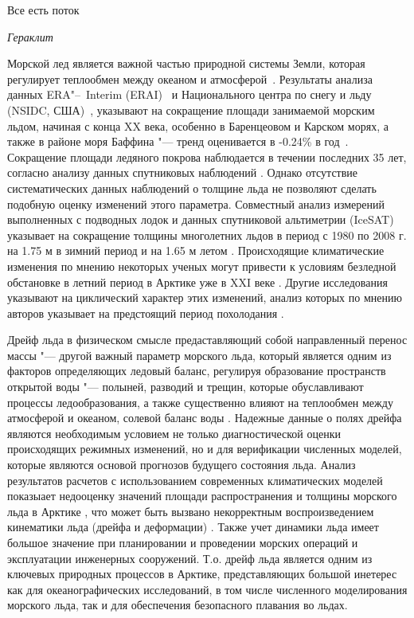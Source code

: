 
{\actuality} \epigraph{Все есть поток}{\textit{Гераклит}}
Морской лед является важной частью природной системы Земли, которая регулирует теплообмен между океаном и атмосферой~\cite{vaughan2013observations}. Результаты анализа данных ERA"--~Interim (ERAI)~\cite{dee2011era} и Национального центра по снегу и льду (NSIDC, США)~\cite{cavalieri1996updated}, указывают на сокращение площади занимаемой морским льдом, начиная с конца XX века, особенно в Баренцеовом и Карском морях, а также в районе моря Баффина "--- тренд оценивается в -0.24\% в год~\cite{park2015attribution}. Сокращение площади ледяного покрова наблюдается в течении последних 35 лет, согласно анализу данных спутниковых наблюдений \cite{simmonds2015comparing}. Однако отсутствие систематических данных наблюдений о толщине льда не позволяют сделать подобную оценку изменений этого параметра. Совместный анализ измерений выполненных с подводных лодок и данных спутниковой альтиметрии (IceSAT) указывает на сокращение толщины многолетних льдов в период с 1980 по 2008 г. на 1.75 м в зимний период и на 1.65 м летом \cite{rothrock2008decline,kwok2009thinning}. Происходящие климатические изменения по мнению некоторых ученых могут привести к условиям безледной обстановке в летний период в Арктике уже в XXI веке  \cite{stroeve2007arctic,wang2009sea,massonnet2012constraining,Laliber_2016,Jahn_2016}. Другие исследования указывают на циклический характер этих изменений, анализ которых по мнению авторов указывает на предстоящий период похолодания \cite{Frolov2010,Frolov2007_1,Frolov2007_2}.

Дрейф льда в физическом смысле предаставляющий собой направленный перенос массы "--- другой важный параметр морского льда, который является одним из факторов определяющих ледовый баланс, регулируя образование пространств открытой воды "--- полыней, разводий и трещин, которые обуславливают процессы ледообразования, а также существенно влияют на теплообмен между атмосферой и океаном, солевой баланс воды \cite{jordan1999heat,Makshtas1977}. Надежные данные о полях дрейфа являются необходимым условием не только диагностической оценки происходящих режимных изменений, но и для верификации численных моделей, которые являются основой прогнозов будущего состояния льда. Анализ результатов расчетов с использованием современных климатических  моделей показыает недооценку значений площади распространения и толщины морского льда в Арктике \cite{stroeve2007arctic}, что может быть вызвано некорректным воспроизведением кинематики льда (дрейфа и деформации)  \cite{rampal2011ipcc}. Также учет динамики льда имеет большое значение при планировании и проведении морских операций и эксплуатации инженерных сооружений. Т.о. дрейф льда является одним из ключевых природных процессов в Арктике, представляющих большой инетерес как для океанографических исследований, в том числе численного моделирования морского льда, так и для обеспечения безопасного плавания во льдах.

